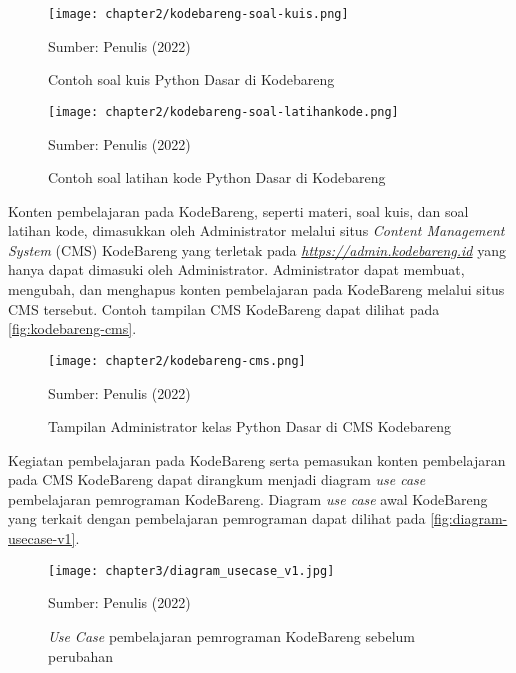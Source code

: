 \begin{figure}[!h]
  \centering
  \texttt{[image: chapter2/kodebareng-soal-kuis.png]}
  \caption{Contoh soal kuis Python Dasar di Kodebareng}\label{fig:kodebareng-soal-kuis}
  Sumber: Penulis (2022)
\end{figure}

\begin{figure}[!h]
  \centering
  \texttt{[image: chapter2/kodebareng-soal-latihankode.png]}
  \caption{Contoh soal latihan kode Python Dasar di Kodebareng}\label{fig:kodebareng-soal-latihankode}
  Sumber: Penulis (2022)
\end{figure}

Konten pembelajaran pada KodeBareng, seperti materi, soal kuis, dan soal latihan kode, dimasukkan oleh Administrator melalui situs \textit{Content Management System} (CMS) KodeBareng yang terletak pada \textit{\href{https://admin.kodebareng.id}{https://admin.kodebareng.id}} yang hanya dapat dimasuki oleh Administrator. Administrator dapat membuat, mengubah, dan menghapus konten pembelajaran pada KodeBareng melalui situs CMS tersebut. Contoh tampilan CMS KodeBareng dapat dilihat pada \autoref{fig:kodebareng-cms}.

\begin{figure}[!h]
  \centering
  \texttt{[image: chapter2/kodebareng-cms.png]}
  \caption{Tampilan Administrator kelas Python Dasar di CMS Kodebareng}\label{fig:kodebareng-cms}
  Sumber: Penulis (2022)
\end{figure}

Kegiatan pembelajaran pada KodeBareng serta pemasukan konten pembelajaran pada CMS KodeBareng dapat dirangkum menjadi diagram \textit{use case} pembelajaran pemrograman KodeBareng. Diagram \textit{use case} awal KodeBareng yang terkait dengan pembelajaran pemrograman dapat dilihat pada \autoref{fig:diagram-usecase-v1}.

\begin{figure}[!h]
  \centering
  \texttt{[image: chapter3/diagram\_usecase\_v1.jpg]}
  \caption{\textit{Use Case} pembelajaran pemrograman KodeBareng sebelum perubahan} \label{fig:diagram-usecase-v1}
  Sumber: Penulis (2022)
\end{figure}